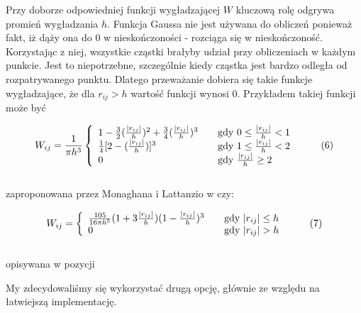 \documentclass[polish, 12pt]{aghthesis}
\begin{document}
			
			Przy doborze odpowiedniej funkcji wygładzającej $W$ kluczową rolę odgrywa promień wygładzania $h$. Funkcja Gaussa nie jest używana do obliczeń ponieważ fakt, iż dąży ona do 0 w nieskończoności - rozciąga się w nieskończoność. Korzystając z niej, wszystkie cząstki brałyby udział przy obliczeniach w każdym punkcie. Jest to niepotrzebne, szczególnie kiedy cząstka jest bardzo odległa od rozpatrywanego punktu. Dlatego przeważanie dobiera się takie funkcje wygładzające, że dla ${r_{ij} > h}$ wartość funkcji wynosi 0. Przykładem takiej funkcji może być
			
			\[ W_{ij} = \frac{1}{\pi h^3} \left\{ 
				\begin{array}{l l l}
					1 - \frac{3}{2}(\frac{|r_{ij}|}{h})^2 + \frac{3}{4}(\frac{|r_{ij}|}{h})^3  & \quad \text{gdy ${0 \leq \frac{|r_{ij}|}{h} < 1}$}  \\ 
					\frac{1}{4}[2 - (\frac{|r_{ij}|}{h})]^3  & \quad \text{gdy ${1 \leq \frac{|r_{ij}|}{h} < 2}$}  \\ 
					0 & \quad \text{gdy ${\frac{|r_{ij}|}{h} \geq 2 }$} 
				\end{array} \right.\ \label{eq:kernel_function} \tag{6}\]
			\ \\
			zaproponowana przez Monaghana i Lattanzio w \cite{MonLat} czy:
			
			\[ W_{ij} = \left\{
				\begin{array}{l l}
					\frac{105}{16 \pi h^5}(1 + 3 \frac{|r_{ij}|}{h})(1-\frac{|r_{ij}|}{h})^3 & \quad \text{gdy ${|r_{ij}| \leq h}$}  \\ 0 & \quad \text{gdy ${|r_{ij}| > h}$} 
				\end{array} \right.\ \label{eq:kernel_function} \tag{7}\]
			\ \\
			opisywana w pozycji \cite{Lucy}
			
			My zdecydowaliśmy się wykorzystać drugą opcję, głównie ze względu na łatwiejszą implementację. 
			
\end{document}
